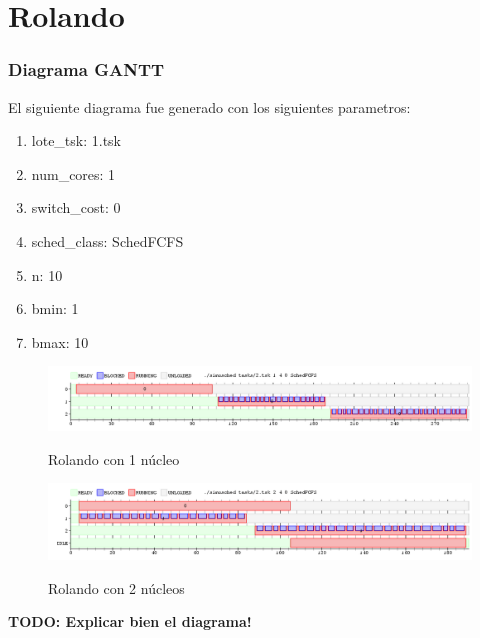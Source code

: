 \section{Rolando}

\subsubsection{Diagrama GANTT}

El siguiente diagrama fue generado con los siguientes parametros:

\begin{enumerate}
	\item lote\_tsk: 1.tsk
	\item num\_cores: 1
	\item switch\_cost: 0
	\item sched\_class: SchedFCFS
	\item n: 10
	\item bmin: 1
	\item bmax: 10
\end{enumerate}

\begin{figure}[h]
    \includegraphics[width=\linewidth]{images/2_1nucleo.png}
    \label{fig:Task Consola}
    \caption{Rolando con 1 núcleo}
\end{figure}

\begin{figure}[h]
    \includegraphics[width=\linewidth]{images/2_2nucleos.png}
    \label{fig:Task Consola}
    \caption{Rolando con 2 núcleos}
\end{figure}

\textbf{TODO: Explicar bien el diagrama!}